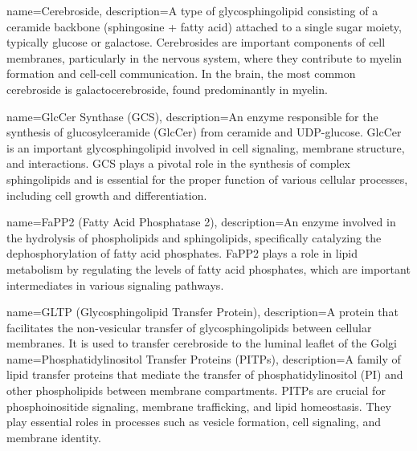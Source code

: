 {
    name={Cerebroside},
    description={A type of glycosphingolipid consisting of a ceramide backbone (sphingosine + fatty acid) attached to a single sugar moiety, typically glucose or galactose. Cerebrosides are important components of cell membranes, particularly in the nervous system, where they contribute to myelin formation and cell-cell communication. In the brain, the most common cerebroside is galactocerebroside, found predominantly in myelin.}
}

{
    name={GlcCer Synthase (GCS)},
    description={An enzyme responsible for the synthesis of glucosylceramide (GlcCer) from ceramide and UDP-glucose. GlcCer is an important glycosphingolipid involved in cell signaling, membrane structure, and interactions. GCS plays a pivotal role in the synthesis of complex sphingolipids and is essential for the proper function of various cellular processes, including cell growth and differentiation.}
}

{
    name={FaPP2 (Fatty Acid Phosphatase 2)},
    description={An enzyme involved in the hydrolysis of phospholipids and sphingolipids, specifically catalyzing the dephosphorylation of fatty acid phosphates. FaPP2 plays a role in lipid metabolism by regulating the levels of fatty acid phosphates, which are important intermediates in various signaling pathways.}
}

{
    name={GLTP (Glycosphingolipid Transfer Protein)},
    description={A protein that facilitates the non-vesicular transfer of glycosphingolipids between cellular membranes. It is used to transfer cerebroside to the luminal leaflet of the Golgi}
}
{
    name={Phosphatidylinositol Transfer Proteins (PITPs)},
    description={A family of lipid transfer proteins that mediate the transfer of phosphatidylinositol (PI) and other phospholipids between membrane compartments. PITPs are crucial for phosphoinositide signaling, membrane trafficking, and lipid homeostasis. They play essential roles in processes such as vesicle formation, cell signaling, and membrane identity.}
}



